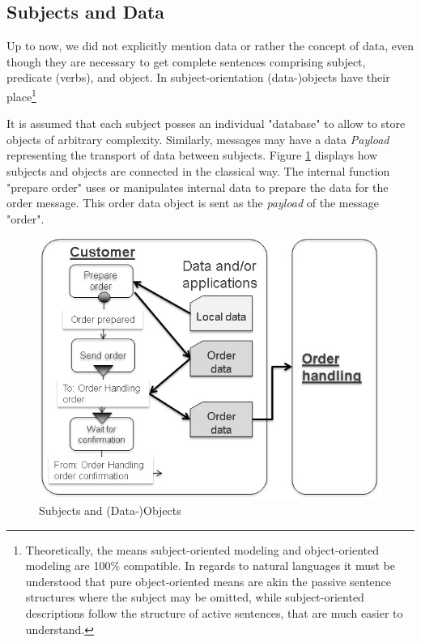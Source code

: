 \subsection{Subjects and Data}
\label{SUbjects-Objects}

Up to now, we did not explicitly mention data or rather the concept of data, even though they are necessary to get complete sentences comprising subject, predicate (verbs), and object. In subject-orientation (data-)objects have their place\footnote{Theoretically, the means subject-oriented modeling and object-oriented modeling are 100\% compatible. In regards to natural languages it must be understood that pure object-oriented means are akin the passive sentence structures where the subject may be omitted, while subject-oriented descriptions follow the structure of active sentences, that are much easier to understand.}


It is assumed that each subject posses an individual "database" to allow to store objects of arbitrary complexity. Similarly, messages may have a data \textit{Payload} representing the transport of data between subjects.
Figure \ref{fig:subjectobject} displays how subjects and objects are connected in the classical way. The internal function  "prepare order" uses or manipulates internal data to prepare the data for the order message. This order data object is sent as the \textit{payload} of the message "order".

\begin{figure}[htbp]
	\centering
	\includegraphics[width=0.9\linewidth]{Figures/Ontology/SubjectBehavior/SUbjectObject}
	\caption[Subjects and (Data-)Objects]{Subjects and (Data-)Objects}
	\label{fig:subjectobject}
\end{figure}



